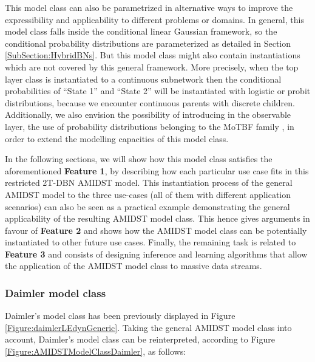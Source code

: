 This model class can also be parametrized in alternative ways to improve the expressibility and applicability to different problems or domains. In general, this model class falls inside the conditional linear Gaussian framework, so the conditional probability distributions are parameterized as detailed in Section \ref{SubSection:HybridBNs}. But this model class might also contain instantiations which are not covered by this general framework. More precisely, when the top layer class is instantiated to  a continuous subnetwork then the conditional probabilities of ``State 1'' and ``State 2'' will be instantiated with logistic or probit distributions, because we encounter continuous parents with discrete children. Additionally, we also envision the possibility of introducing in the observable layer, the use of probability distributions belonging to the MoTBF family \cite{Langseth12}, in order to extend the modelling capacities of this model class.

In the following sections, we will show how this model class satisfies the aforementioned \textbf{Feature 1}, by describing how each particular use case fits in this restricted 2T-DBN AMIDST model. This instantiation process of the general AMIDST model to the three use-cases (all of them with different application scenarios) can also be seen as a practical example demonstrating the general applicability of the resulting AMIDST model class. This hence gives arguments in favour of \textbf{Feature 2} and shows how the AMIDST model class can be potentially instantiated to other future use cases. Finally, the remaining task is related to \textbf{Feature 3} and consists of designing inference and learning algorithms that allow the application of the AMIDST model class to massive data streams. 



\subsubsection{Daimler model class}\label{daimlerAMIDSTModels}


Daimler's model class has been previously displayed in Figure \ref{Figure:daimlerLEdynGeneric}. Taking the general AMIDST model class into account, Daimler's model class can be reinterpreted, according to Figure \ref{Figure:AMIDSTModelClassDaimler}, as follows:

